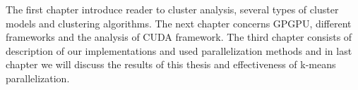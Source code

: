 


The first chapter introduce reader to cluster analysis, several types of cluster models and clustering algorithms. The next chapter concerns GPGPU, different frameworks and the analysis of CUDA framework. The third chapter consists of description of our implementations and used parallelization methods and in last chapter we will discuss the results of this thesis and effectiveness of k-means parallelization. 